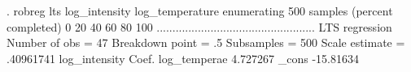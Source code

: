 . robreg lts log_intensity log_temperature
{\smallskip}
enumerating 500 samples (percent completed)
0  20  40  60  80  100
..................................................
{\smallskip}
LTS regression                                  Number of obs     =         47
                                                  Breakdown point =         .5
                                                  Subsamples      =        500
                                                  Scale estimate  =  .40961741
{\smallskip}
log_intensity {\VBAR}      Coef.
log_tempera{\tytilde}e {\VBAR}   4.727267
        _cons {\VBAR}  -15.81634
{\smallskip}
